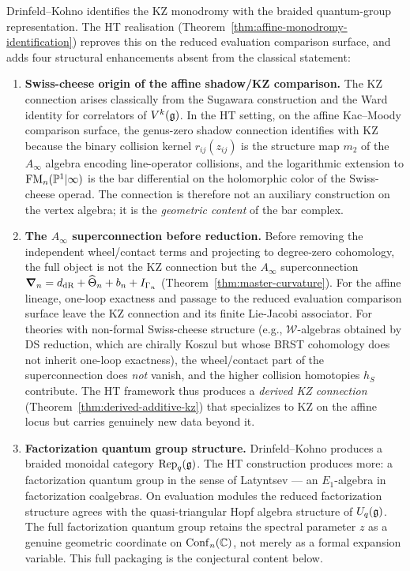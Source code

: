 Drinfeld--Kohno \cite{Dri89} identifies the KZ monodromy with the
braided quantum-group representation. The HT realisation
(Theorem~\ref{thm:affine-monodromy-identification}) reproves this on
the reduced evaluation comparison surface, and adds four structural
enhancements absent from the classical statement:

\begin{enumerate}[label=\textup{(\Roman*)}]
\item \textbf{Swiss-cheese origin of the affine shadow/KZ comparison.}
The KZ connection arises classically from the Sugawara construction and
the Ward identity for correlators of $V^k(\mathfrak{g})$. In the HT setting, on
the affine Kac--Moody comparison surface, the genus-zero shadow
connection identifies with KZ because the binary collision kernel
$r_{ij}(z_{ij})$ is the structure map $m_2$ of the $A_\infty$ algebra
encoding line-operator collisions, and the logarithmic extension to
$\mathrm{FM}_n(\mathbb P^1|\infty)$ is the bar differential on the holomorphic color of
the Swiss-cheese operad. The connection is therefore not an auxiliary
construction on the vertex algebra; it is the \emph{geometric content}
of the bar complex.

\item \textbf{The $A_\infty$ superconnection before reduction.}
Before removing the independent wheel/contact terms and projecting to degree-zero
cohomology, the full object is not the KZ connection but the $A_\infty$
superconnection $\boldsymbol{\nabla}_n = d_{\mathrm{dR}} + \widehat{\Theta}_n + b_n +
I_{\Gamma_n}$ (Theorem~\ref{thm:master-curvature}). For the affine
lineage, one-loop exactness and passage to
the reduced evaluation comparison surface leave the KZ
connection and its finite Lie-Jacobi associator. For theories with non-formal Swiss-cheese structure (e.g., $\mathcal{W}$-algebras
obtained by DS reduction, which are chirally Koszul but whose BRST cohomology does not inherit
one-loop exactness), the wheel/contact part of the superconnection does \emph{not} vanish, and
the higher collision homotopies $h_S$ contribute. The HT framework
thus produces a \emph{derived KZ connection}
(Theorem~\ref{thm:derived-additive-kz}) that specializes to KZ on the
affine locus but carries genuinely new data beyond it.

\item \textbf{Factorization quantum group structure.}
Drinfeld--Kohno produces a braided monoidal category
$\mathrm{Rep}_q(\mathfrak{g})$. The HT construction produces more: a
factorization quantum group in the sense of Latyntsev \cite{Lat23} —
an $E_1$-algebra in factorization coalgebras. On evaluation modules
the reduced factorization structure agrees with the quasi-triangular
Hopf algebra structure of $U_q(\mathfrak{g})$. The full factorization quantum
group retains the spectral parameter $z$ as a genuine geometric
coordinate on $\mathrm{Conf}_n(\mathbb C)$, not merely as a formal expansion
variable. This full packaging is the conjectural content below.


\end{enumerate}

